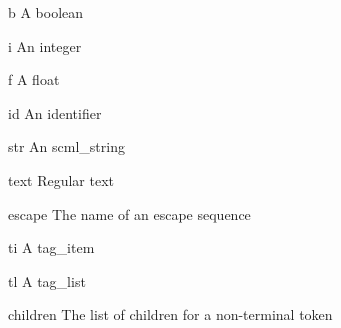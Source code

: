 \begin{cidentifierlist}
  \item[b]
  A boolean

  \item[i]
  An integer

  \item[f]
  A float

  \item[id]
  An identifier

  \item[str]
  An scml\_string

  \item[text]
  Regular text

  \item[escape]
  The name of an escape sequence

  \item[ti]
  A tag\_item

  \item[tl]
  A tag\_list

  \item[children]
  The list of children for a non-terminal token
\end{cidentifierlist}

